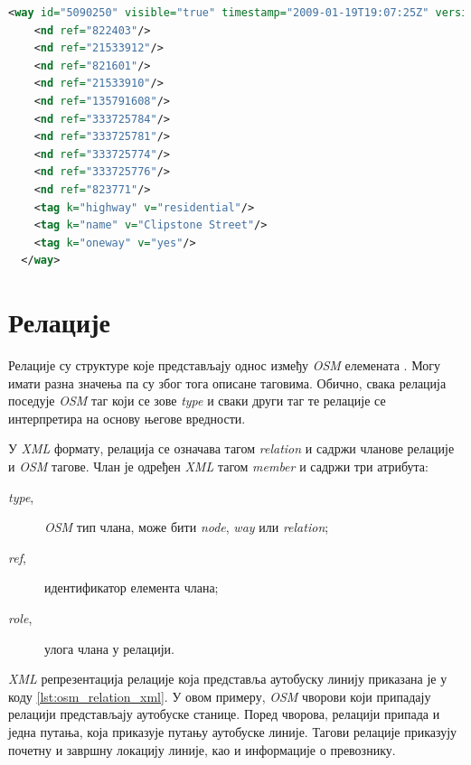 \documentclass[12pt,oneside]{memoir}
\begin{document}
\begin{lstlisting}[language=XML, caption={\textit{XML} запис \textit{OSM} путањe која представља ауто-пут}, label={lst:osm_way_xml}]
<way id="5090250" visible="true" timestamp="2009-01-19T19:07:25Z" version="8" changeset="816806" user="Blumpsy" uid="64226">
    <nd ref="822403"/>
    <nd ref="21533912"/>
    <nd ref="821601"/>
    <nd ref="21533910"/>
    <nd ref="135791608"/>
    <nd ref="333725784"/>
    <nd ref="333725781"/>
    <nd ref="333725774"/>
    <nd ref="333725776"/>
    <nd ref="823771"/>
    <tag k="highway" v="residential"/>
    <tag k="name" v="Clipstone Street"/>
    <tag k="oneway" v="yes"/>
  </way>
\end{lstlisting}

\section{Релације}
\label{sec:osm_relations}

Релације су структуре које представљају однос између \textit{OSM} елемената \cite{osm_wiki}. Могу имати разна значења па су због тога описане таговима. Обично, свака релација поседује \textit{OSM} таг који се зове \textit{type} и сваки други таг те релације се интерпретира на основу његове вредности.

У \textit{XML} формату, релација се означава тагом \textit{relation} и садржи чланове релације и \textit{OSM} тагове. Члан је одређен \textit{XML} тагом \textit{member} и садржи три атрибута:

\begin{description}
	\item[\textit{type},] \textit{OSM} тип члана, може бити \textit{node}, \textit{way} или \textit{relation};
	\item[\textit{ref},] идентификатор елемента члана;
	\item[\textit{role},] улога члана у релацији.
\end{description}

\textit{XML} репрезентација релације која представља аутобуску линију приказана је у коду \ref{lst:osm_relation_xml}. У овом примеру, \textit{OSM} чворови који припадају релацији представљају аутобуске станице. Поред чворова, релацији припада и једна путања, која приказује путању аутобуске линије. Тагови релације приказују почетну и завршну локацију линије, као и информације о превознику.
\end{document}
